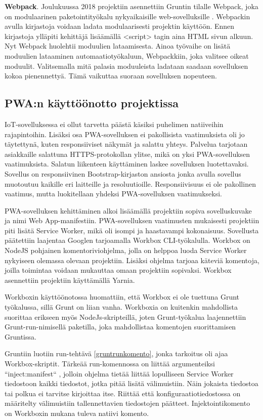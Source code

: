 \documentclass{tktltiki}
\begin{document}
\textbf{Webpack}. Joulukuussa 2018 projektiin asennettiin Gruntin tilalle Webpack, joka on modulaarinen paketointityökalu nykyaikaisille web-sovelluksille \cite{subramanian2017modularization}. Webpackin avulla kirjastoja voidaan ladata modulaarisesti projektin käyttöön. Ennen kirjastoja ylläpiti kehittäjä lisäämällä <script> tagin aina HTML sivun alkuun. Nyt Webpack huolehtii moduulien lataamisesta. Ainoa työvaihe on lisätä moduulien lataaminen automaatiotyökaluun, Webpackkiin, joka valitsee oikeat moduulit. Valitsemalla mitä palasia moduuleista ladataan saadaan sovelluksen kokoa pienennettyä. Tämä vaikuttaa suoraan sovelluksen nopeuteen.


\subsection{PWA:n käyttöönotto projektissa}

IoT-sovelluksessa ei ollut tarvetta päästä käsiksi puhelimen natiiveihin rajapintoihin. Lisäksi osa PWA-sovelluksen ei pakollisista vaatimuksista oli jo täytettynä, kuten responsiiviset näkymät ja salattu yhteys. Palvelua tarjotaan asiakkaille salattuna HTTPS-protokollan ylitse, mikä on yksi PWA-sovelluksen vaatimuksista. Salatun liikenteen käyttäminen laskee sovelluksen luotettavaksi. Sovellus on responsiivinen Bootstrap-kirjaston ansiosta jonka avulla sovellus muotoutuu kaikille eri laitteille ja resoluutioille. Responsiivisuus ei ole pakollinen vaatimus, mutta luokitellaan yhdeksi PWA-sovelluksen vaatimukseksi.

PWA-sovelluksen kehittäminen alkoi lisäämällä projektiin sopiva sovelluskuvake ja nimi Web App-manifestiin. PWA-sovelluksen vaatimusten mukaisesti projektiin piti lisätä Service Worker, mikä oli isompi ja haastavampi kokonaisuus. Sovellusta päätettiin laajentaa Googlen tarjoamalla Workbox CLI-työkalulla. Workbox on NodeJS pohjainen komentoriviohjelma, jolla on helppoa luoda Service Worker nykyiseen olemassa olevaan projektiin. Lisäksi ohjelma tarjoaa käteviä komentoja, joilla toimintaa voidaan mukauttaa omaan projektiin sopivaksi. Workbox asennettiin projektiin käyttämällä Yarnia.

Workboxin käyttöönotossa huomattiin, että Workbox ei ole tuettuna Grunt työkalussa, sillä Grunt on liian vanha. Workboxia on kuitenkin mahdollista suorittaa erikseen myös NodeJs-skripteillä, joten Grunt-työkalua laajennettiin Grunt-run-nimisellä paketilla, joka mahdollistaa komentojen suorittamisen Gruntissa. 

Gruntiin luotiin run-tehtävä \ref{gruntrunkomento}, jonka tarkoitus oli ajaa Workbox-skriptit. Tärkeää run-komennossa on liittää argumenteiksi “inject:manifest“ \cite{Googlec}, jolloin ohjelma tietää liittää lopulliseen Service Worker tiedostoon kaikki tiedostot, jotka pitää lisätä välimuistiin. Näin jokaista tiedostoa tai polkua ei tarvitse kirjoittaa itse. Riittää että konfiguraatiotiedostossa on määritelty välimuistiin tallennettavien tiedostojen päätteet. Injektointikomento on Workboxin mukana tuleva natiivi komento.
\end{document}
